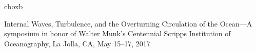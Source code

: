\documentclass[final]{beamer}
\begin{document}
\begin{frame}[t]
\begin{columns}[t]
\begin{column}{0.55\textwidth}
\begin{columns}
\begin{column}{0.475\textwidth}
\begin{block}{}
                          \end{block}

                      \end{column}

                      \end{columns}
    \end{column}
 \end{columns}

 \hspace{1cm}
 \vspace{-1.5cm}
   \hspace{0.5in}\begin{beamercolorbox}[wd=46.15in,colsep=0.15cm]{cboxb}\end{beamercolorbox}
   \vspace{-.9cm}
 \begin{flushleft}
\hskip1.92cm  Internal Waves, Turbulence, and the Overturning Circulation of the Ocean---A
 symposium in honor of Walter Munk's Centennial \hskip15.03cm
 Scripps Institution of Oceanography, La Jolla, CA, May 15--17, 2017
 \end{flushleft}

\end{frame}
\end{document}
